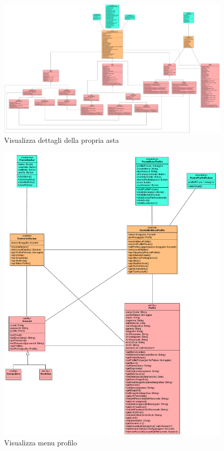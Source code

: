             \begin{figure}[htbp!]
                \centering
                    \includegraphics[width=1\linewidth]{Immagini/Diagrammi/Class Diagram/Utente che ha effettuato l'accesso/VisualizzaDettagliPropriaAsta.pdf}
                \caption{Visualizza dettagli della propria asta}
            \end{figure}
            
            \begin{figure}[htbp!]
                \centering
                    \includegraphics[width=1\linewidth]{Immagini/Diagrammi/Class Diagram/Utente che ha effettuato l'accesso/VisualizzaMenuProfilo.pdf}
                \caption{Visualizza menu profilo}
            \end{figure}
            
